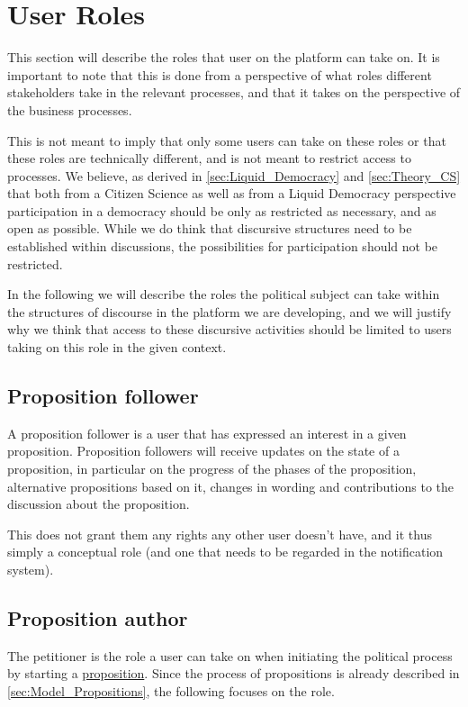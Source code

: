 \section{User Roles}
\label{sec:UserRoles}
This section will describe the roles that user on the platform can take on.
It is important to note that this is done from a perspective of what roles different stakeholders take in the relevant processes, and that it takes on the perspective of the business processes.

This is not meant to imply that only some users can take on these roles or that these roles are technically different, and is not meant to restrict access to processes. We believe, as derived in \ref{sec:Liquid_Democracy} and \ref{sec:Theory_CS} that both from a Citizen Science as well as from a Liquid Democracy perspective participation in a democracy should be only as restricted as necessary, and as open as possible. While we do think that discursive structures need to be established within discussions, the possibilities for participation should not be restricted.

In the following we will describe the roles the political subject can take within the structures of discourse in the platform we are developing, and we will justify why we think that access to these discursive activities should be limited to users taking on this role in the given context.

\subsection{Proposition follower}
A proposition follower is a user that has expressed an interest in a given proposition. Proposition followers will receive updates on the state of a proposition, in particular on the progress of the phases of the proposition, alternative propositions based on it, changes in wording and contributions to the discussion about the proposition.

This does not grant them any rights any other user doesn't have, and it thus simply a conceptual role (and one that needs to be regarded in the notification system).

\subsection{Proposition author}
\label{ssec:Roles_Petitioner}
The petitioner is the role a user can take on when initiating the political process by starting a \hyperref[sec:Model_Propositions]{proposition}. Since the process of propositions is already described in \ref{sec:Model_Propositions}, the following focuses on the role.

